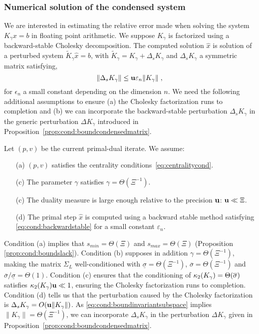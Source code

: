 \subsubsection{Numerical solution of the condensed system}
We are interested in estimating the relative error
made when solving the system $K_\gamma x = b$ in floating
point arithmetic. We suppose $K_\gamma$ is factorized using
a backward-stable Cholesky decomposition. The computed
solution $\widehat{x}$ is solution of a perturbed system
$\widetilde{K}_\gamma \widehat{x} = b$, with $\widetilde{K}_\gamma
= K_\gamma + \Delta_s K_\gamma$ and $\Delta_s K_\gamma$ a symmetric matrix satisfying,
\begin{equation}
  \label{eq:cond:backwardstable}
  \|\Delta_s K_\gamma\| \leq \mathbf{u} \varepsilon_n \|K_\gamma\| \;,
\end{equation}
for $\epsilon_n$ a small constant depending on the dimension $n$.
We need the following additional assumptions to
ensure (a) the Cholesky factorization runs to completion
and (b) we can incorporate the backward-stable perturbation $\Delta_s K_\gamma$
in the generic perturbation $\Delta K_\gamma$ introduced in
Proposition~\ref{prop:cond:boundcondensedmatrix}.
\begin{assumption} Let $(p, v)$ be the current primal-dual iterate. We assume:
  \begin{itemize}
    \item[(a)] $(p, v)$ satisfies the centrality conditions~\eqref{eq:centralitycond}.
    \item[(c)] The parameter $\gamma$ satisfies $\gamma = \Theta(\Xi^{-1})$.
    \item[(c)] The duality measure is large enough relative to the precision $\mathbf{u}$: $\mathbf{u} \ll \Xi$.
    \item[(d)] The primal step $\widehat{x}$ is computed using a backward
      stable method satisfying \eqref{eq:cond:backwardstable} for a small constant
      $\varepsilon_n$.
  \end{itemize}
  \label{hyp:cond:wellcond}
\end{assumption}
Condition (a) implies that
$s_{min} = \Theta(\Xi)$ and $s_{max} = \Theta(\Xi)$ (Proposition \ref{prop:cond:boundslack}).
Condition (b) supposes in addition $\gamma = \Theta(\Xi^{-1})$, making
the matrix $\Sigma_L$ well-conditioned with
$\underline{\sigma} = \Theta(\Xi^{-1})$,
$\overline{\sigma} = \Theta(\Xi^{-1})$ and $\overline{\sigma}/\underline{\sigma} = \Theta(1)$.
Condition (c) ensures that the conditioning of $\kappa_2(K_\gamma) = \Theta(\overline{\sigma})$
satisfies $\kappa_2(K_\gamma) \mathbf{u} \ll 1$,
ensuring the Cholesky factorization runs to completion.
Condition (d) tells us that the perturbation caused by the Cholesky
factorization is $\Delta_s K_\gamma = O(\mathbf{u} \| K_\gamma\|)$. As
\eqref{eq:cond:boundinvariantsubspace} implies $\|K_\gamma \| = \Theta(\Xi^{-1})$,
we can incorporate $\Delta_s K_\gamma$ in the perturbation
$\Delta K_\gamma$ given in Proposition~\ref{prop:cond:boundcondensedmatrix}.

